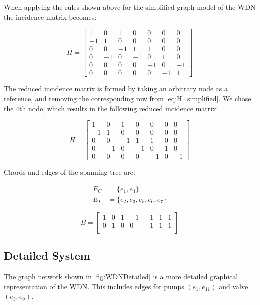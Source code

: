 When applying the rules shown above for the simplified graph model of the WDN the incidence matrix becomes:

\begin{equation}
	H = \begin{bmatrix}
		1 & 0 & 1 & 0 & 0 & 0 & 0\\
		-1 & 1 & 0 & 0 & 0 & 0 & 0\\
		0 & 0 & -1 & 1 & 1 & 0 & 0\\
		0 & -1 & 0 & -1 & 0 & 1 & 0\\
		0 & 0 & 0 & 0 & -1 &  0  & -1\\
		0 & 0 & 0 & 0 & 0 & -1 & 1
	\end{bmatrix}
	\label{eq:H_simplified}
\end{equation} 


The reduced incidence matrix is formed by taking an arbitrary node as a reference, and removing the corresponding row from \cref{eq:H_simplified}. We chose the $4$th node, which results in the following reduced incidence matrix:

\begin{equation}
	\bar{H} = \begin{bmatrix}
	1 & 0 & 1 & 0 & 0 & 0 & 0\\
	-1 & 1 & 0 & 0 & 0 & 0 & 0\\
	0 & 0 & -1 & 1 & 1 & 0 & 0\\
	0 & -1 & 0 & -1 & 0 & 1 & 0\\
	0 & 0 & 0 & 0 & -1 &  0  & -1
	\end{bmatrix}
\end{equation}

Chords and edges of the spanning tree are:

\begin{equation} 
	\begin{split}
		E_{C} &= \{e_{1},e_{4}\}   \\ E_{T} &= \{e_2,e_3,e_5,e_6,e_7\}
	\end{split}
\end{equation}


\begin{equation}
	B = \begin{bmatrix}
		1 & 0 & 1 & -1 & -1 & 1 & 1\\
		0 & 1 & 0 & 0 & -1 & 1 & 1\\
	\end{bmatrix}
\end{equation}

\clearpage
\subsection{Detailed System}
The graph network shown in \cref{fig:WDNDetailed} is a more detailed graphical representation of the WDN. This includes edges for pumps $(e_{1},e_{11})$ and valve $(e_{3},e_{9})$. 

